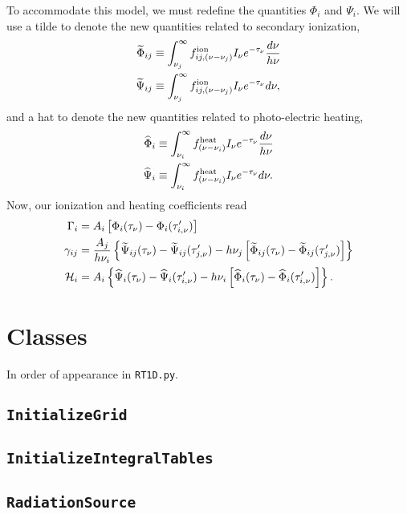 \documentclass[letterpaper,titlepage,12pt]{article}
\numberwithin{equation}{section}
\begin{document}
To accommodate this model, we must redefine the quantities $\Phi_i$ and $\Psi_i$.  We will use a tilde to denote the new quantities related to secondary ionization, 
\begin{align}
    \widetilde{\Phi}_{ij} & \equiv \int_{\nu_j}^{\infty} f_{ij,(\nu - \nu_j)}^{\text{ion}} I_{\nu} e^{-\tau_{\nu}} \frac{d\nu}{h\nu} \\
    \widetilde{\Psi}_{ij} & \equiv \int_{\nu_j}^{\infty} f_{ij,(\nu - \nu_j)}^{\text{ion}} I_{\nu} e^{-\tau_{\nu}} d\nu ,
\end{align}
and a hat to denote the new quantities related to photo-electric heating,
\begin{align}
    \widehat{\Phi}_i & \equiv \int_{\nu_i}^{\infty} f_{(\nu - \nu_i)}^{\text{heat}} I_{\nu} e^{-\tau_{\nu}} \frac{d\nu}{h\nu} \\
    \widehat{\Psi}_i & \equiv \int_{\nu_i}^{\infty} f_{(\nu - \nu_i)}^{\text{heat}} I_{\nu} e^{-\tau_{\nu}} d\nu .
\end{align}
Now, our ionization and heating coefficients read
\begin{align}
    \Gamma_i & = A_i \left[\Phi_i(\tau_{\nu}) - \Phi_i(\tau_{i,\nu}^{\prime}) \right] \label{eq:Gamma_PhiPsi_complex} \\
    \gamma_{ij} & = \frac{A_j}{h\nu_i} \left\{\widetilde{\Psi}_{ij}(\tau_{\nu}) - \widetilde{\Psi}_{ij}(\tau_{j,\nu}^{\prime}) - h \nu_j \left[\widetilde{\Phi}_{ij}(\tau_{\nu}) - \widetilde{\Phi}_{ij}(\tau_{j,\nu}^{\prime}) \right] \right\}  \label{eq:gamma_PhiPsi_complex} \\
    \mathcal{H}_i & = A_i \left\{\widehat{\Psi}_i(\tau_{\nu}) - \widehat{\Psi}_i(\tau_{i,\nu}^{\prime}) - h\nu_i \left[\widehat{\Phi}_i(\tau_{\nu}) - \widehat{\Phi}_i(\tau_{i,\nu}^{\prime}) \right] \right\} \label{eq:Heat_PhiPsi_complex} .  
\end{align}    


\section{Classes}
In order of appearance in \texttt{RT1D.py}.

\subsection{\texttt{InitializeGrid}}
\subsection{\texttt{InitializeIntegralTables}}
\subsection{\texttt{RadiationSource}}
\end{document}
